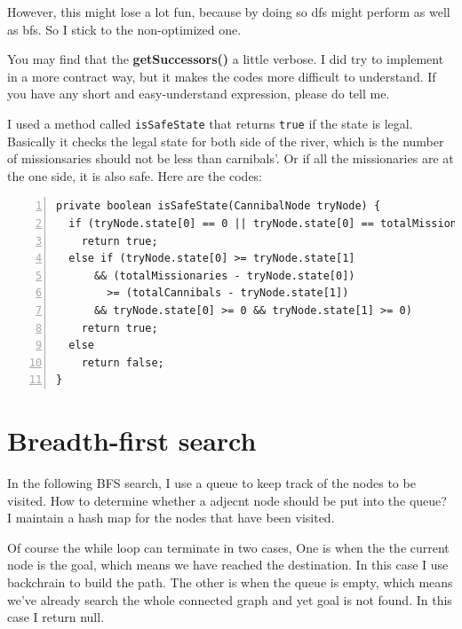 \documentclass{article}
\begin{document}
However, this might lose a lot fun, because by doing so dfs might perform as well as bfs. So I stick to the non-optimized one.

You may find that the \textbf{getSuccessors()} a little verbose. I did try to implement in a more contract way, but it makes the codes more difficult to understand. If you have any short and easy-understand expression, please do tell me.

I used a method called \verb`isSafeState` that returns \verb`true` if the state is legal. Basically it checks the legal state for both side of the river, which is the number of missionsaries should not be less than carnibals'. Or if all the missionaries are at the one side, it is also safe. Here are the codes:

\begin{lstlisting}[numbers=left]
private boolean isSafeState(CannibalNode tryNode) {
  if (tryNode.state[0] == 0 || tryNode.state[0] == totalMissionaries)
    return true;
  else if (tryNode.state[0] >= tryNode.state[1]
      && (totalMissionaries - tryNode.state[0])
      	>= (totalCannibals - tryNode.state[1])
      && tryNode.state[0] >= 0 && tryNode.state[1] >= 0)
    return true;
  else
    return false;
}
\end{lstlisting}



\section{Breadth-first search}

In the following BFS search, I use a queue to keep track of the nodes to be visited. How to determine whether a adjecnt node should be put into the queue? I maintain a hash map for the nodes that have been visited.

Of course the while loop can terminate in two cases, One is when the the current node is the goal, which means we have reached the destination. In this case I use backchrain to build the path. The other is when the queue is empty, which means we've already search the whole connected graph and yet goal is not found. In this case I return null.
\end{document}
